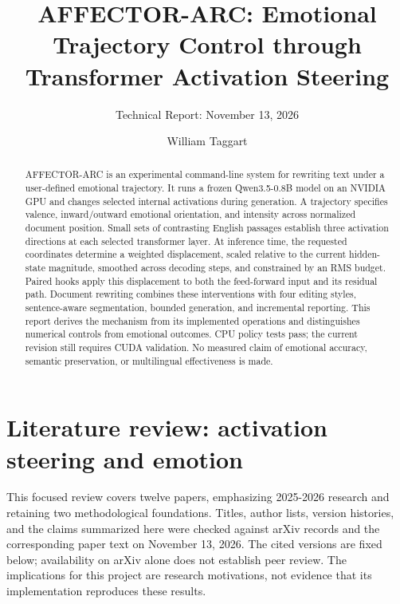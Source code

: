 \documentclass[manuscript,screen,nonacm]{acmart}
\begin{document}
\title{AFFECTOR-ARC: Emotional Trajectory Control through Transformer
Activation Steering}
\author{William Taggart}
\subtitle{Technical Report: November 13, 2026}
\begin{abstract}
AFFECTOR-ARC is an experimental command-line system for rewriting text
under a user-defined emotional trajectory. It runs a frozen Qwen3.5-0.8B
model on an NVIDIA GPU and changes selected internal activations during
generation. A trajectory specifies valence, inward/outward emotional
orientation, and intensity across normalized document position. Small
sets of contrasting English passages establish three activation
directions at each selected transformer layer. At inference time, the
requested coordinates determine a weighted displacement, scaled relative
to the current hidden-state magnitude, smoothed across decoding steps,
and constrained by an RMS budget. Paired hooks apply this displacement
to both the feed-forward input and its residual path. Document rewriting
combines these interventions with four editing styles, sentence-aware
segmentation, bounded generation, and incremental reporting. This report
derives the mechanism from its implemented operations and distinguishes
numerical controls from emotional outcomes. CPU policy tests pass; the
current revision still requires CUDA validation. No measured claim of
emotional accuracy, semantic preservation, or multilingual effectiveness
is made.
\end{abstract}
\maketitle
\section{Literature review: activation steering and
emotion}\label{literature-review-activation-steering-and-emotion}

This focused review covers twelve papers, emphasizing 2025-2026 research
and retaining two methodological foundations. Titles, author lists,
version histories, and the claims summarized here were checked against
arXiv records and the corresponding paper text on November 13, 2026. The
cited versions are fixed below; availability on arXiv alone does not
establish peer review. The implications for this project are research
motivations, not evidence that its implementation reproduces these
results.
\end{document}
